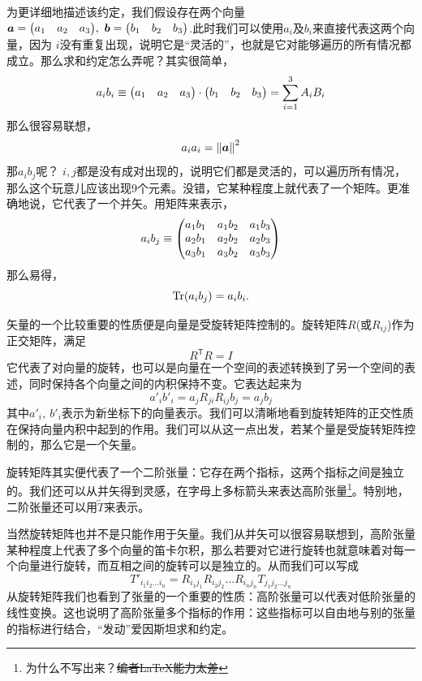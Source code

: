 \documentclass[12pt,a4paper,openany,twoside]{book}
\numberwithin{equation}{section}
\begin{document}
    为更详细地描述该约定，我们假设存在两个向量$\vb*{a}=\mqty(\xmat*{a}{1}{3}),\ \vb*{b}=\mqty(\xmat*{b}{1}{3})$.此时我们可以使用$a_i$及$b_i$来直接代表这两个向量，因为 $i$没有重复出现，说明它是“灵活的”，也就是它对能够遍历的所有情况都成立。那么求和约定怎么弄呢？其实很简单，
    \begin{equation*}
      a_ib_i\equiv\mqty(\xmat*{a}{1}{3})\cdot\mqty(\xmat*{b}{1}{3})=\sum_{i=1}^3{A_iB_i}
    \end{equation*} 
    那么很容易联想，
    \begin{equation*}
      a_ia_i=\norm{\vb*{a}}^2
    \end{equation*} 
    那$a_ib_j$呢？ $i,j$都是没有成对出现的，说明它们都是灵活的，可以遍历所有情况，那么这个玩意儿应该出现9个元素。没错，它某种程度上就代表了一个矩阵。更准确地说，它代表了一个并矢。用矩阵来表示，
    \begin{equation*}
      a_ib_j\equiv\mqty(
        a_1b_1 & a_1b_2 & a_1b_3 \\
        a_2b_1 & a_2b_2 & a_2b_3 \\
        a_3b_1 & a_3b_2 & a_3b_3 
      )
    \end{equation*} 
    那么易得，
    \begin{equation}
      \Tr(a_ib_j)=a_ib_i.
    \end{equation}

    矢量的一个比较重要的性质便是向量是受旋转矩阵控制的。旋转矩阵$R$(或$R_{ij}$)作为正交矩阵，满足
    \begin{equation*}
      R^\mathsf{T}R=I
    \end{equation*}
    它代表了对向量的旋转，也可以是向量在一个空间的表述转换到了另一个空间的表述，同时保持各个向量之间的内积保持不变。它表达起来为
    \begin{equation*}
      a'_ib'_i=a_jR_{ji}R_{ij}b_j=a_jb_j
    \end{equation*} 
    其中$a'_i,\ b'_i$表示为新坐标下的向量表示。我们可以清晰地看到旋转矩阵的正交性质在保持向量内积中起到的作用。我们可以从这一点出发，若某个量是受旋转矩阵控制的，那么它是一个矢量。

    旋转矩阵其实便代表了一个二阶张量：它存在两个指标，这两个指标之间是独立的。我们还可以从并矢得到灵感，在字母上多标箭头来表达高阶张量\footnote{为什么不写出来？\sout{编者\LaTeX 能力太差}}。特别地，二阶张量还可以用$\overleftrightarrow{T}$来表示。

    当然旋转矩阵也并不是只能作用于矢量。我们从并矢可以很容易联想到，高阶张量某种程度上代表了多个向量的笛卡尔积，那么若要对它进行旋转也就意味着对每一个向量进行旋转，而互相之间的旋转可以是独立的。从而我们可以写成
    \begin{equation*}
      T'_{i_1i_2\dots i_n}=R_{i_1j_1}R_{i_2j_2}\dots R_{i_nj_n}T_{j_1j_2\dots j_n}
    \end{equation*} 
    从旋转矩阵我们也看到了张量的一个重要的性质：高阶张量可以代表对低阶张量的线性变换。这也说明了高阶张量多个指标的作用：这些指标可以自由地与别的张量的指标进行结合，“发动”爱因斯坦求和约定。
\end{document}
